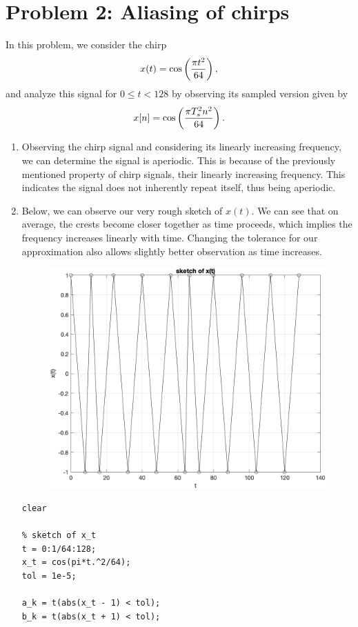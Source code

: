\documentclass[12pt]{article}
\begin{document}
\section*{Problem 2: Aliasing of chirps}
In this problem, we consider the chirp
\begin{equation} \notag
    x(t)=\cos\left(\frac{\pi t^2}{64}\right),
\end{equation}
and analyze this signal for $0\le t<128$ by observing its sampled version given by
\begin{equation} \notag
    x[n]=\cos\left(\frac{\pi T^2_sn^2}{64}\right).
\end{equation}
\begin{enumerate}[label=\textbf{\alph*)}, leftmargin=2.6em]

\item Observing the chirp signal and considering its linearly increasing frequency, we can determine the signal is aperiodic. This is because of the previously mentioned property of chirp signals, their linearly increasing frequency. This indicates the signal does not inherently repeat itself, thus being aperiodic.

\item Below, we can observe our very rough sketch of $x(t)$. We can see that on average, the crests become closer together as time proceeds, which implies the frequency increases linearly with time. Changing the tolerance for our approximation also allows slightly better observation as time increases.
\begin{figure} [H]
    \centering
    \includegraphics[width=0.5\linewidth]{2b.png}
\end{figure}
\begin{verbatim}
clear

% sketch of x_t
t = 0:1/64:128;
x_t = cos(pi*t.^2/64);
tol = 1e-5;

a_k = t(abs(x_t - 1) < tol);
b_k = t(abs(x_t + 1) < tol);


\end{verbatim}
\end{enumerate}
\end{document}
